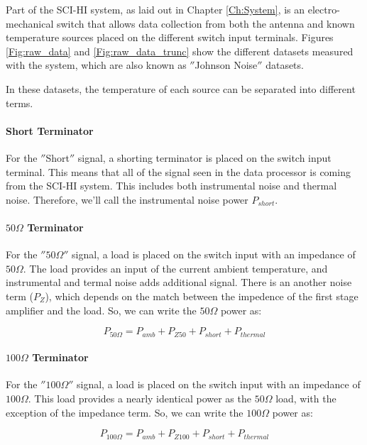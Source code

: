Part of the SCI-HI system, as laid out in Chapter \ref{Ch:System}, is an electro-mechanical switch that allows data collection from both the antenna and known temperature sources placed on the different switch input terminals. Figures \ref{Fig:raw_data} and \ref{Fig:raw_data_trunc} show the different datasets measured with the system, which are also known as $''$Johnson Noise$''$ datasets. 

In these datasets, the temperature of each source can be separated into different terms. 

\paragraph{Short Terminator}
For the $''$Short$''$ signal, a shorting terminator is placed on the switch input terminal. This means that all of the signal seen in the data processor is coming from the SCI-HI system. This includes both instrumental noise and thermal noise. Therefore, we'll call the instrumental noise power $P_{short}$.

\paragraph{$50 \Omega$ Terminator}
For the $'' 50 \Omega ''$ signal, a load is placed on the switch input with an impedance of $50 \Omega$. The load provides an input of the current ambient temperature, and instrumental and termal noise adds additional signal. There is an another noise term ($P_Z$), which depends on the match between the impedence of the first stage amplifier and the load. So, we can write the $50 \Omega$ power as:

\begin{equation}
P_{50 \Omega} = P_{amb}+P_{Z50}+P_{short}+P_{thermal}
\end{equation}

\paragraph{$100 \Omega$ Terminator}
For the $'' 100 \Omega ''$ signal, a load is placed on the switch input with an impedance of $100 \Omega$. This load provides a nearly identical power as the $50 \Omega$ load, with the exception of the impedance term. So, we can write the $100 \Omega$ power as:

\begin{equation}
P_{100 \Omega} = P_{amb}+P_{Z100}+P_{short}+P_{thermal}
\end{equation}

